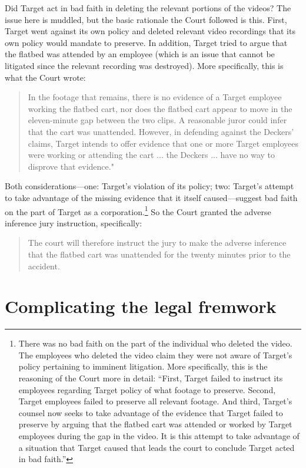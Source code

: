 \documentclass[
  10pt,
  dvipsnames,enabledeprecatedfontcommands]{scrartcl}
\begin{document}
Did Target act in bad faith in deleting the relevant portions of the
videos? The issue here is muddled, but the basic rationale the Court
followed is this. First, Target went against its own policy and deleted
relevant video recordings that its own policy would mandate to preserve.
In addition, Target tried to argue that the flatbed was attended by an
employee (which is an issue that cannot be litigated since the relevant
recording was destroyed). More specifically, this is what the Court
wrote:

\begin{quote}
In the footage that remains, there is no evidence of a Target employee working the flatbed cart, nor does the flatbed cart appear to move in the eleven-minute gap between the two clips. A reasonable juror could infer that the cart was unattended. However, in defending against the Deckers’ claims, Target intends to offer evidence that one or more Target employees were working or attending the cart ... the Deckers ... have no way to disprove that evidence."
\end{quote}

\noindent Both considerations---one: Target's violation of its policy;
two: Target's attempt to take advantage of the missing evidence that it
itself caused---suggest bad faith on the part of Target as a
corporation.\footnote{There was no bad faith on the part of the
  individual who deleted the video. The employees who deleted the video
  claim they were not aware of Target's policy pertaining to imminent
  litigation. More specifically, this is the reasoning of the Court more
  in detail: ``First, Target failed to instruct its employees regarding
  Target policy of what footage to preserve. Second, Target employees
  failed to preserve all relevant footage. And third, Target's counsel
  now seeks to take advantage of the evidence that Target failed to
  preserve by arguing that the flatbed cart was attended or worked by
  Target employees during the gap in the video. It is this attempt to
  take advantage of a situation that Target caused that leads the court
  to conclude Target acted in bad faith.''} So the Court granted the
adverse inference jury instruction, specifically:

\begin{quote}
The court will therefore instruct the jury to make the adverse inference that the flatbed cart was unattended for the twenty minutes prior to the accident.
\end{quote}

\hypertarget{complicating-the-legal-fremwork}{%
\section{Complicating the legal
fremwork}\label{complicating-the-legal-fremwork}}
\end{document}
